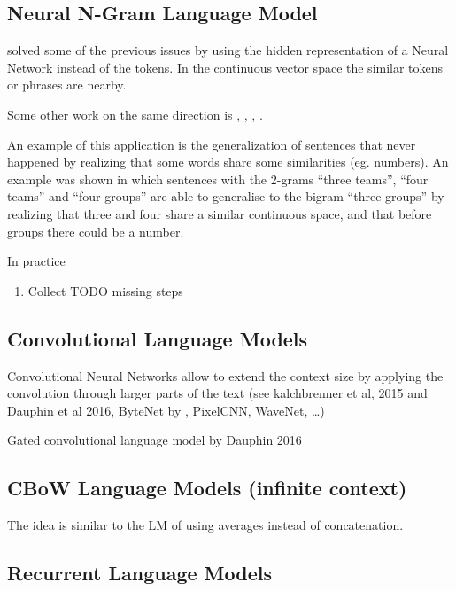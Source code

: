 \subsection{Neural N-Gram Language Model}

\cite{bengio2003neural} solved some of the previous issues by using the
hidden representation of a Neural Network instead of the tokens. In the
continuous vector space the similar tokens or phrases are nearby.

Some other work on the same direction is \cite{mikolov2013distributed},
, \cite{pennington2014glove}, \cite{le2014distributed}.

An example of this application is the generalization of sentences that never
happened by realizing that some words share some similarities (eg. numbers). An
example was shown in which sentences with the 2-grams ``three teams'', ``four
teams'' and ``four groups'' are able to generalise to the bigram ``three
groups'' by realizing that three and four share a similar continuous space, and
that before groups there could be a number.

In practice

\begin{enumerate}
  \item Collect TODO missing steps
\end{enumerate}

\subsection{Convolutional Language Models}

Convolutional Neural Networks allow to extend the context size by applying the
convolution through larger parts of the text (see kalchbrenner et al, 2015 and
Dauphin et al 2016, ByteNet by \cite{kalchbrenner2016neural}, PixelCNN,
WaveNet, \dots)

Gated convolutional language model by Dauphin 2016 \cite{dauphin2016language}


\subsection{CBoW Language Models (infinite context)}

The idea is similar to the LM of using averages instead of concatenation.

\subsection{Recurrent Language Models}

